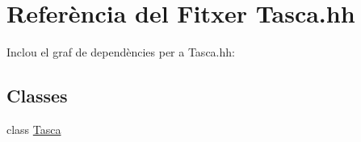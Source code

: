 \hypertarget{_tasca_8hh}{}\section{Referència del Fitxer Tasca.\+hh}
\label{_tasca_8hh}
Inclou el graf de dependències per a Tasca.\+hh\+:
\subsection*{Classes}
\begin{DoxyCompactItemize}
\item 
class \hyperlink{class_tasca}{Tasca}
\end{DoxyCompactItemize}
